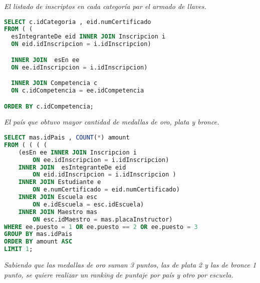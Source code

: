 

\emph{El listado de inscriptos en cada categoría par el armado de llaves.}
\begin{lstlisting}[language=SQL]
SELECT c.idCategoria , eid.numCertificado
FROM ( (
  esIntegranteDe eid INNER JOIN Inscripcion i
  ON eid.idInscripcion = i.idInscripcion)

  INNER JOIN  esEn ee
  ON ee.idInscripcion = i.idInscripcion)

  INNER JOIN Competencia c
  ON c.idCompetencia = ee.idCompetencia

ORDER BY c.idCompetencia;
\end{lstlisting}

\emph{El país que obtuvo mayor cantidad de medallas de oro, plata y bronce.}
\begin{lstlisting}[language=SQL]
SELECT mas.idPais , COUNT(*) amount
FROM ( ( ( (
    (esEn ee INNER JOIN Inscripcion i
        ON ee.idInscripcion = i.idInscripcion)
    INNER JOIN  esIntegranteDe eid
        ON eid.idInscripcion = i.idInscripcion )
    INNER JOIN Estudiante e
        ON e.numCertificado = eid.numCertificado)
    INNER JOIN Escuela esc
        ON e.idEscuela = esc.idEscuela)
    INNER JOIN Maestro mas
        ON esc.idMaestro = mas.placaInstructor)
WHERE ee.puesto = 1 OR ee.puesto == 2 OR ee.puesto = 3
GROUP BY mas.idPais
ORDER BY amount ASC
LIMIT 1;
\end{lstlisting}


\emph{Sabiendo que las medallas de oro suman 3 puntos, las de plata 2 y las de bronce 1 punto, se quiere realizar un ranking de puntaje por país y otro por escuela.}

